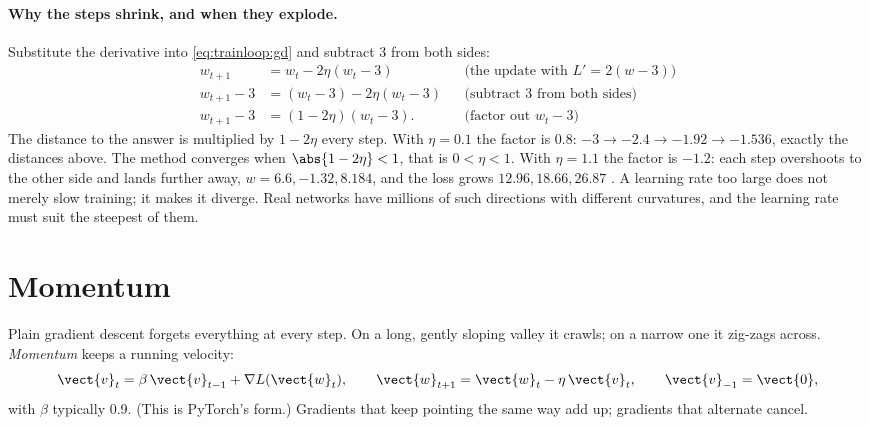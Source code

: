 \paragraph{Why the steps shrink, and when they explode.} Substitute the derivative into
\cref{eq:trainloop:gd} and subtract 3 from both sides:
\begin{align*}
w_{t+1} &= w_t - 2\eta(w_t - 3)
  && \text{(the update with $L' = 2(w - 3)$)}\\
w_{t+1} - 3 &= (w_t - 3) - 2\eta(w_t - 3)
  && \text{(subtract 3 from both sides)}\\
w_{t+1} - 3 &= (1 - 2\eta)(w_t - 3).
  && \text{(factor out $w_t - 3$)}
\end{align*}
The distance to the answer is multiplied by $1 - 2\eta$ every step. With $\eta = 0.1$ the factor
is $0.8$: $-3 \to -2.4 \to -1.92 \to -1.536$, exactly the distances above. The method converges
when $\abs{1 - 2\eta} < 1$, that is $0 < \eta < 1$. With $\eta = 1.1$ the factor is $-1.2$: each
step overshoots to the other side and lands further away, $w = 6.6, -1.32, 8.184$, and the
loss grows $12.96, 18.66, 26.87$ \tagC. A learning rate too large does not merely slow
training; it makes it diverge. Real networks have millions of such directions with different
curvatures, and the learning rate must suit the steepest of them.

\section{Momentum}\label{sec:trainloop:momentum}

Plain gradient descent forgets everything at every step. On a long, gently sloping valley it
crawls; on a narrow one it zig-zags across. \emph{Momentum}
\citep{polyak1964some} keeps a running velocity:
\begin{equation}\label{eq:trainloop:momentum}
\vect{v}_{t} = \beta\,\vect{v}_{t-1} + \nabla L(\vect{w}_t), \qquad
\vect{w}_{t+1} = \vect{w}_t - \eta\,\vect{v}_t, \qquad \vect{v}_{-1} = \vect{0},
\end{equation}
with $\beta$ typically 0.9. (This is PyTorch's  form.) Gradients that
keep pointing the same way add up; gradients that alternate cancel.

